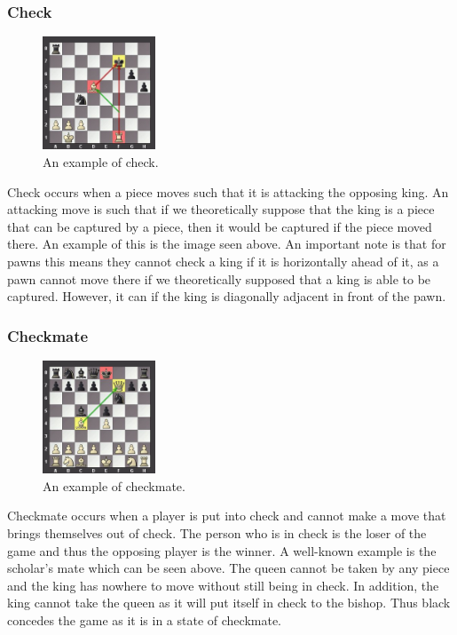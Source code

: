 \documentclass[twoside, 12pt]{report}
\begin{document}
\subsubsection{Check}
\begin{figure}[H]
\centering
	\includegraphics[width=0.3\textwidth]{images/boards/check_example}
	\caption{An example of check.}
\end{figure}
Check occurs when a piece moves such that it is attacking the opposing king. An attacking move is such that if we theoretically suppose that the king is a piece that can be captured by a piece, then it would be captured if the piece moved there. An example of this is the image seen above. An important note is that for pawns this means they cannot check a king if it is horizontally ahead of it, as a pawn cannot move there if we theoretically supposed that a king is able to be captured. However, it can if the king is diagonally adjacent in front of the pawn. 
\subsubsection{Checkmate}
\begin{figure}[H]
\centering
	\includegraphics[width=0.3\textwidth]{images/boards/checkmate_example}
	\caption{An example of checkmate.}
\end{figure}
Checkmate occurs when a player is put into check and cannot make a move that brings themselves out of check. The person who is in check is the loser of the game and thus the opposing player is the winner. A well-known example is the scholar's mate which can be seen above. The queen cannot be taken by any piece and the king has nowhere to move without still being in check. In addition, the king cannot take the queen as it will put itself in check to the bishop. Thus black concedes the game as it is in a state of checkmate.
\end{document}
